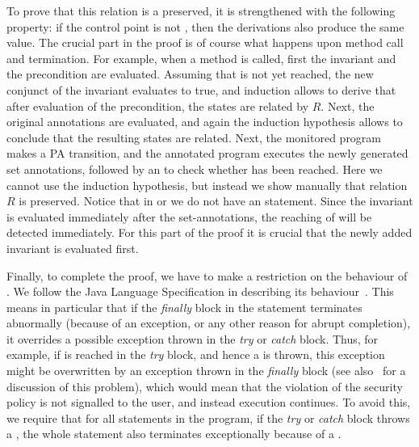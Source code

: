 To prove that this relation is a preserved, it is
strengthened with the following property: if the control point is not
\halted, then the derivations also produce the same value. The crucial
part in the proof is of course what happens upon method call and
termination. For example, when a method is called, first the invariant
and the precondition are evaluated. Assuming that \halted is not yet
reached, the new conjunct of the invariant evaluates to true, and
induction allows to derive that after evaluation of the precondition,
the states are related by \(R\). Next, the original \preset
annotations are evaluated, and again the induction hypothesis allows
to conclude that the resulting states are related. Next, the monitored
program makes a PA transition, and the annotated program executes the
newly generated set annotations, followed by an \Assert to check
whether
\halted has been reached. Here we cannot use the induction hypothesis,
but instead we show manually that relation \(R\) is preserved.
Notice that in \postset or \excset we do not have an \Assert
statement. Since the invariant is evaluated immediately after the
set-annotations, the reaching of \halted will be detected
immediately. For this part of the proof it is crucial that
the newly added invariant is evaluated first.

Finally,  to complete the proof, we have to make a
restriction on the behaviour of \TryCatch. We follow the Java Language
Specification in describing its behaviour~\cite{GoslingJSB05}. This
means in particular that if the \emph{finally} block in the statement
terminates abnormally (because of an exception, or any other reason
for abrupt completion), it overrides a possible exception thrown in
the \emph{try} or \emph{catch} block. Thus, for example, if \halted
is reached in the \emph{try} block, and hence a \JMLExc is thrown, this
exception might be overwritten by an exception thrown in the
\emph{finally} block (see also~\cite{Huisman08} for a discussion of
this problem), which would mean that the violation of the security
policy is not signalled to the user, and instead execution
continues. To avoid this, we require that for all \TryCatch statements
in the program, if the \emph{try} or
\emph{catch} block throws a \JMLExc, the whole statement
also terminates exceptionally because of a \JMLExc.



